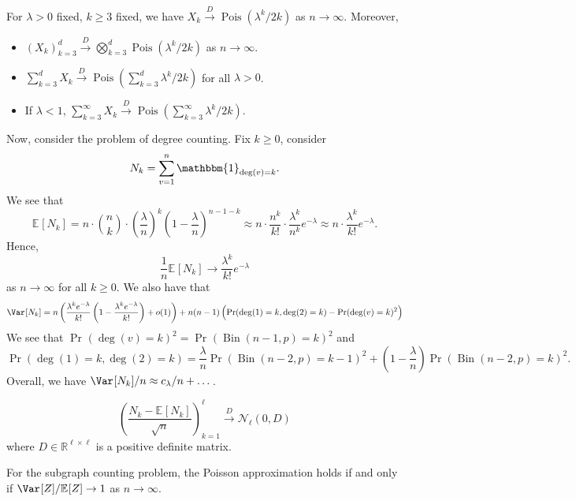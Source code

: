 \begin{theorem}
	For \(\lambda > 0\) fixed, \(k \geq 3\) fixed, we have \(X_k \overset{D}{\to} \operatorname{Pois}(\lambda ^k / 2k) \) as \(n \to \infty \). Moreover,
	\begin{itemize}
		\item \((X_k)_{k = 3}^d \overset{D}{\to} \bigotimes_{k=3}^d \operatorname{Pois}(\lambda ^k / 2k) \) as \(n \to \infty \).
		\item \(\sum_{k=3}^{d} X_k \overset{D}{\to} \operatorname{Pois}(\sum_{k=3}^{d} \lambda ^k / 2k) \) for all \(\lambda > 0\).
		\item If \(\lambda < 1\), \(\sum_{k=3}^{\infty} X_k \overset{D}{\to} \operatorname{Pois}(\sum_{k=3}^{\infty} \lambda ^k / 2k) \).
	\end{itemize}
\end{theorem}

Now, consider the problem of degree counting. Fix \(k \geq 0\), consider
\[
	N_k = \sum_{v=1}^{n} \mathbbm{1}_{\deg (v) = k}.
\]
We see that
\[
	\mathbb{E}_{}[N_k]
	= n \cdot \binom{n}{k} \cdot \left( \frac{\lambda}{n} \right) ^k \left( 1 - \frac{\lambda}{n} \right) ^{n-1-k}
	\approx n \cdot \frac{n^k}{k!} \cdot \frac{\lambda ^k}{n^k} e^{-\lambda }
	\approx n \cdot \frac{\lambda ^k}{k!} e^{-\lambda }.
\]
Hence,
\[
	\frac{1}{n} \mathbb{E}_{}[N_k]
	\to \frac{\lambda ^k}{k!} e^{-\lambda }
\]
as \(n \to \infty \) for all \(k \geq 0\). We also have that
\[
	\Var_{}[N_k]
	= n \left( \frac{\lambda ^k e^{-\lambda }}{k!} \left( 1 - \frac{\lambda ^k e^{-\lambda }}{k!} \right) + o(1) \right) + n(n-1) \left( \Pr_{}(\deg (1) = k, \deg (2) = k) - \Pr_{}(\deg (v) = k)^2 \right)
\]
We see that \(\Pr_{}(\deg (v) = k)^2 = \Pr_{}(\operatorname{Bin}(n-1, p) =k)^2\) and
\[
	\Pr_{}(\deg (1) = k, \deg (2) = k)
	= \frac{\lambda}{n} \Pr_{}(\operatorname{Bin}(n-2, p) = k-1 ) ^2 + \left( 1 - \frac{\lambda}{n} \right) \Pr_{}(\operatorname{Bin}(n-2, p) = k )^2.
\]
Overall, we have \(\Var_{}[N_k] / n \approx c_\lambda / n + \dots \).

\begin{theorem}
	\[
		\left( \frac{N_k - \mathbb{E}_{}[N_k] }{\sqrt{n} } \right) _{k=1}^{\ell }
		\overset{D}{\to} \mathcal{N} _\ell (0, D)
	\]
	where \(D \in \mathbb{R} ^{\ell \times \ell }\) is a positive definite matrix.
\end{theorem}

\begin{remark}
	For the subgraph counting problem, the Poisson approximation holds if and only if \(\Var_{}[Z] / \mathbb{E}_{}[Z] \to 1\) as \(n \to \infty \).
\end{remark}

